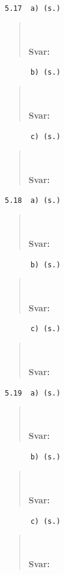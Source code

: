 \documentclass[a4paper]{article}
\newcommand{\tskcol}[1]{\textcolor{tskcol}{#1}}
\begin{document}
	\texttt{\tskcol{5.17~~a) (s.)}}
	\begin{quotation}
		\noindent
		\\ \\
		\textbf{Svar:}
	\end{quotation}
	
	\texttt{\tskcol{~~~~~~b) (s.)}}
	\begin{quotation}
		\noindent
		\\ \\
		\textbf{Svar:}
	\end{quotation}
	
	\texttt{\tskcol{~~~~~~c) (s.)}}
	\begin{quotation}
		\noindent
		\\ \\
		\textbf{Svar:}
	\end{quotation}
	
	\texttt{\tskcol{5.18~~a) (s.)}}
	\begin{quotation}
		\noindent
		\\ \\
		\textbf{Svar:}
	\end{quotation}
	
	\texttt{\tskcol{~~~~~~b) (s.)}}
	\begin{quotation}
		\noindent
		\\ \\
		\textbf{Svar:}
	\end{quotation}
	
	\texttt{\tskcol{~~~~~~c) (s.)}}
	\begin{quotation}
		\noindent
		\\ \\
		\textbf{Svar:}
	\end{quotation}
	
	\texttt{\tskcol{5.19~~a) (s.)}}
	\begin{quotation}
		\noindent
		\\ \\
		\textbf{Svar:}
	\end{quotation}
	
	\texttt{\tskcol{~~~~~~b) (s.)}}
	\begin{quotation}
		\noindent
		\\ \\
		\textbf{Svar:}
	\end{quotation}
	
	\texttt{\tskcol{~~~~~~c) (s.)}}
	\begin{quotation}
		\noindent
		\\ \\
		\textbf{Svar:}
	\end{quotation}
	
\end{document}
